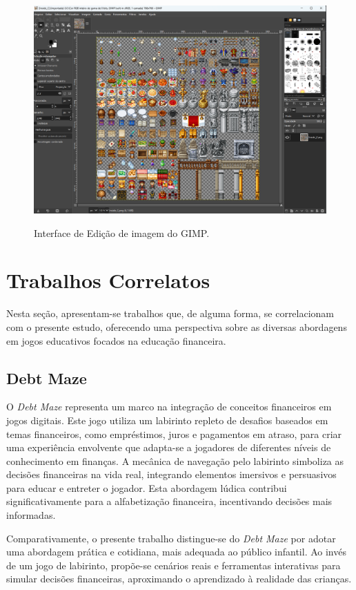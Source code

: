 \begin{figure}[ht]
	\centering
	\caption{Interface de Edição de imagem do GIMP.}
	\includegraphics[scale=0.4]{Textuais/Pictures/Gimp.png}
	\label{fig:gimp-interface}
\end{figure}


\section{Trabalhos Correlatos}
Nesta seção, apresentam-se trabalhos que, de alguma forma, se correlacionam com o presente estudo, oferecendo uma perspectiva sobre as diversas abordagens em jogos educativos focados na educação financeira.

\subsection{Debt Maze}
O \textit{Debt Maze} \cite{Debt_Maze} representa um marco na integração de conceitos financeiros em jogos digitais. Este jogo utiliza um labirinto repleto de desafios baseados em temas financeiros, como empréstimos, juros e pagamentos em atraso, para criar uma experiência envolvente que adapta-se a jogadores de diferentes níveis de conhecimento em finanças. A mecânica de navegação pelo labirinto simboliza as decisões financeiras na vida real, integrando elementos imersivos e persuasivos para educar e entreter o jogador. Esta abordagem lúdica contribui significativamente para a alfabetização financeira, incentivando decisões mais informadas.

Comparativamente, o presente trabalho distingue-se do \textit{Debt Maze} por adotar uma abordagem prática e cotidiana, mais adequada ao público infantil. Ao invés de um jogo de labirinto, propõe-se cenários reais e ferramentas interativas para simular decisões financeiras, aproximando o aprendizado à realidade das crianças.

